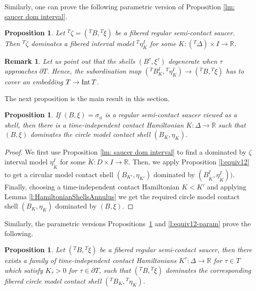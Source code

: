 \documentclass[12pt]{paper}
\theoremstyle{plain}
\newtheorem{proposition}[theorem]{Proposition}
\newtheorem{prop}[theorem]{Proposition}
\newtheorem{remark}[theorem]{Remark}
\theoremstyle{definition}
\newcommand{\wt}{\widetilde}
\newcommand{\p}{\partial}
\newcommand{\R}{{\mathbb{R}}}
\newcommand{\Int}{{\rm Int\,}} %
\numberwithin{figure}{section}
\begin{document}
Similarly, one can prove    the following parametric version of Proposition \ref{lm: saucer dom interval}.
\begin{proposition}\label{lm:saucer-dom-interval-param}
Let ${}^T\zeta=({}^TB,{}^T\xi)$ be a fibered  regular semi-contact saucer.
 Then ${}^T\zeta$ dominates a fibered  interval model ${}^T\eta^I_K$ for some $K:\left({}^T \Delta\right)\times I \to \R$.   
\end{proposition}

\begin{remark}{\rm Let us point out that the shells $(B^\tau, \xi^\tau)$ degenerate when $\tau$ approaches $\p T$. Hence, the subordination map
$({}^TB^I_K,{}^T\eta^I_K)\to ({}^TB,{}^T\xi)$ has to cover an embedding
$T\to\Int T$.
}
\end{remark}

The next proposition is the main result in this section. 

 \begin{prop}\label{prop:saucer-to-circle}
If $(B, \xi) = \sigma_\phi$ is a regular semi-contact saucer viewed as a shell,
then there is a time-independent contact Hamiltonian $K:\Delta\to\R$
such that $(B, \xi)$ dominates the circle model contact shell $(B_K, \eta_K)$.
\end{prop}

\begin{proof}%
 We first use  Proposition \ref{lm: saucer dom interval} to find
  a dominated by $\zeta$ interval model $\eta^I_{\wt K}$ for some ${\wt K}:D\times I \to \R$. Then, we apply Proposition \ref{l:equiv12} to get a circular  model
  contact shell $(B_{K'}, \eta_{K'})$ dominated by $\left(B^I_{\wt K},   \eta^I_{\wt K}\right))$. Finally, choosing a time-independent contact Hamiltonian $K<K'$ and applying  Lemma \ref{l:HamiltonianShellsAnnulus} we get the required  circle model contact shell 
  $\left(B_K, \eta_K\right)$  dominated by $ (B, \xi)$.
\end{proof}

Similarly, the parametric versions Propositions~\ref{lm:saucer-dom-interval-param} and \ref{l:equiv12-param} prove the following.

\begin{prop}\label{prop:saucer-to-circle-param}
Let $({}^TB, {}^T\xi)$ be a fibered  regular semi-contact saucer,
then there exists a family of time-independent  contact Hamiltonians
$K^\tau:\Delta\to\R$ for $\tau\in T$  which satisfy $K_\tau>0$ for $\tau\in \p T$, such that $({}^TB, {}^T\xi)$ dominates the corresponding fibered  circle model contact shell $({}^TB_K, {}^T\eta_K)$.  
\end{prop}
\end{document}
